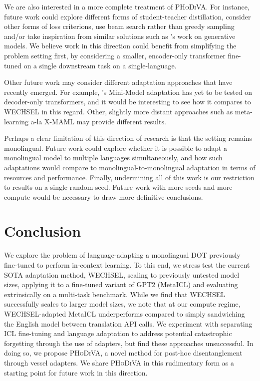 \documentclass[11pt]{article}
\begin{document}
We are also interested in a more complete treatment of \textsc{PHoDiVA}. For instance, future work
could explore different forms of student-teacher distillation, consider other forms of loss
criterions, use beam search rather than greedy sampling and/or take inspiration from similar
solutions such as \citet{khrulkov_disentangled_2021}'s work on generative models. We believe work in
this direction could benefit from simplifying the problem setting first, by considering a smaller,
encoder-only transformer fine-tuned on a single downstream task on a single-language.

Other future work may consider different adaptation approaches that have recently emerged. For
example, \citet{marchisio_mini-model_2022}'s Mini-Model adaptation has yet to be tested on
decoder-only transformers, and it would be interesting to see how it compares to WECHSEL in this
regard. Other, slightly more distant approaches such as meta-learning a-la X-MAML
\citep{nooralahzadeh_zero-shot_2020} may provide different results.

Perhaps a clear limitation of this direction of research is that the setting remains monolingual.
Future work could explore whether it is possible to adapt a monolingual model to multiple languages
simultaneously, and how such adaptations would compare to monolingual-to-monolingual adaptation in
terms of resources and performance. Finally, undermining all of this work is our restriction to
results on a single random seed. Future work with more seeds and more compute would be necessary to
draw more definitive conclusions.

\section{Conclusion}

We explore the problem of language-adapting a monolingual DOT previously fine-tuned to perform
in-context learning. To this end, we stress test the current SOTA adaptation method, WECHSEL,
scaling to previously untested model sizes, applying it to a fine-tuned variant of GPT2 (MetaICL)
and evaluating extrinsically on a multi-task benchmark. While we find that WECHSEL successfully
scales to larger model sizes, we note that at our compute regime, WECHSEL-adapted MetaICL
underperforms compared to simply sandwiching the English model between translation API calls. We
experiment with separating ICL fine-tuning and language adaptation to address potential catastrophic
forgetting through the use of adapters, but find these approaches unsuccessful. In doing so, we
propose \textsc{PHoDiVA}, a novel method for post-hoc disentanglement through vessel adapters. We
share \textsc{PHoDiVA} in this rudimentary form as a starting point for future work in this
direction.
\end{document}
